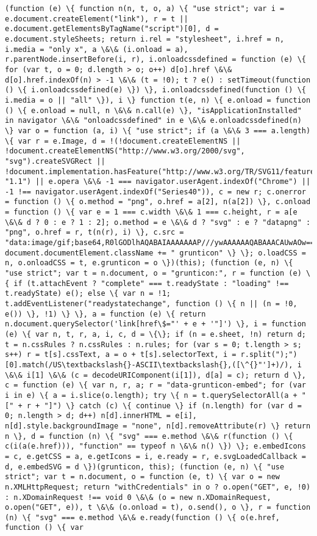 \documentclass[11pt]{article}
\begin{document}
\begin{Verbatim}[commandchars=\\\{\}]
                (function (e) \{ function n(n, t, o, a) \{ "use strict"; var i = e.document.createElement("link"), r = t || e.document.getElementsByTagName("script")[0], d = e.document.styleSheets; return i.rel = "stylesheet", i.href = n, i.media = "only x", a \&\& (i.onload = a), r.parentNode.insertBefore(i, r), i.onloadcssdefined = function (e) \{ for (var t, o = 0; d.length > o; o++) d[o].href \&\& d[o].href.indexOf(n) > -1 \&\& (t = !0); t ? e() : setTimeout(function () \{ i.onloadcssdefined(e) \}) \}, i.onloadcssdefined(function () \{ i.media = o || "all" \}), i \} function t(e, n) \{ e.onload = function () \{ e.onload = null, n \&\& n.call(e) \}, "isApplicationInstalled" in navigator \&\& "onloadcssdefined" in e \&\& e.onloadcssdefined(n) \} var o = function (a, i) \{ "use strict"; if (a \&\& 3 === a.length) \{ var r = e.Image, d = !(!document.createElementNS || !document.createElementNS("http://www.w3.org/2000/svg", "svg").createSVGRect || !document.implementation.hasFeature("http://www.w3.org/TR/SVG11/feature\#Image", "1.1") || e.opera \&\& -1 === navigator.userAgent.indexOf("Chrome") || -1 !== navigator.userAgent.indexOf("Series40")), c = new r; c.onerror = function () \{ o.method = "png", o.href = a[2], n(a[2]) \}, c.onload = function () \{ var e = 1 === c.width \&\& 1 === c.height, r = a[e \&\& d ? 0 : e ? 1 : 2]; o.method = e \&\& d ? "svg" : e ? "datapng" : "png", o.href = r, t(n(r), i) \}, c.src = "data:image/gif;base64,R0lGODlhAQABAIAAAAAAAP///ywAAAAAAQABAAACAUwAOw==", document.documentElement.className += " grunticon" \} \}; o.loadCSS = n, o.onloadCSS = t, e.grunticon = o \})(this); (function (e, n) \{ "use strict"; var t = n.document, o = "grunticon:", r = function (e) \{ if (t.attachEvent ? "complete" === t.readyState : "loading" !== t.readyState) e(); else \{ var n = !1; t.addEventListener("readystatechange", function () \{ n || (n = !0, e()) \}, !1) \} \}, a = function (e) \{ return n.document.querySelector('link[href\$="' + e + '"]') \}, i = function (e) \{ var n, t, r, a, i, c, d = \{\}; if (n = e.sheet, !n) return d; t = n.cssRules ? n.cssRules : n.rules; for (var s = 0; t.length > s; s++) r = t[s].cssText, a = o + t[s].selectorText, i = r.split(");")[0].match(/US\textbackslash{}-ASCII\textbackslash{},([\^{}"']+)/), i \&\& i[1] \&\& (c = decodeURIComponent(i[1]), d[a] = c); return d \}, c = function (e) \{ var n, r, a; r = "data-grunticon-embed"; for (var i in e) \{ a = i.slice(o.length); try \{ n = t.querySelectorAll(a + "[" + r + "]") \} catch (c) \{ continue \} if (n.length) for (var d = 0; n.length > d; d++) n[d].innerHTML = e[i], n[d].style.backgroundImage = "none", n[d].removeAttribute(r) \} return n \}, d = function (n) \{ "svg" === e.method \&\& r(function () \{ c(i(a(e.href))), "function" == typeof n \&\& n() \}) \}; e.embedIcons = c, e.getCSS = a, e.getIcons = i, e.ready = r, e.svgLoadedCallback = d, e.embedSVG = d \})(grunticon, this); (function (e, n) \{ "use strict"; var t = n.document, o = function (e, t) \{ var o = new n.XMLHttpRequest; return "withCredentials" in o ? o.open("GET", e, !0) : n.XDomainRequest !== void 0 \&\& (o = new n.XDomainRequest, o.open("GET", e)), t \&\& (o.onload = t), o.send(), o \}, r = function (n) \{ "svg" === e.method \&\& e.ready(function () \{ o(e.href, function () \{ var 
\end{Verbatim}
\end{document}
